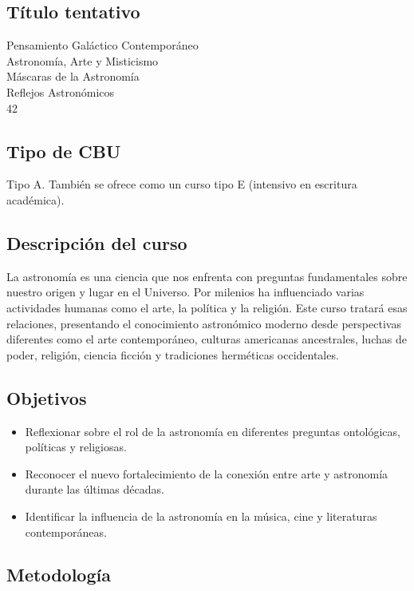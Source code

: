 \documentclass{report}
\begin{document}
\subsection*{\bf T\'itulo tentativo}
Pensamiento Gal\'actico Contempor\'aneo\\
Astronom\'ia, Arte y Misticismo\\
M\'ascaras de la Astronom\'ia\\
Reflejos Astron\'omicos\\
42\\

\subsection*{Tipo de CBU}
Tipo A. Tambi\'en se ofrece como un curso tipo E (intensivo en
escritura acad\'emica). 


\subsection*{Descripci\'on del curso}
La astronom\'ia es una ciencia que nos enfrenta con preguntas
fundamentales sobre nuestro origen y lugar en el Universo. Por
milenios ha influenciado varias actividades humanas como el arte, la
pol\'itica y la religi\'on. Este curso tratar\'a esas relaciones,
presentando el conocimiento astron\'omico moderno desde perspectivas
diferentes como el arte contempor\'aneo, culturas americanas
ancestrales, luchas de poder, religi\'on, ciencia ficci\'on y
tradiciones herm\'eticas occidentales.   
\subsection*{Objetivos}

\begin{itemize}
\item Reflexionar sobre el rol de la astronom\'ia en diferentes
  preguntas ontol\'ogicas, pol\'iticas y religiosas. 
\item Reconocer el nuevo fortalecimiento de la conexi\'on entre arte y
  astronom\'ia durante las \'ultimas d\'ecadas.
\item Identificar la influencia de la astronom\'ia en la m\'usica,
  cine y literaturas contempor\'aneas.
\end{itemize}

\subsection*{Metodolog\'ia}
\end{document}

